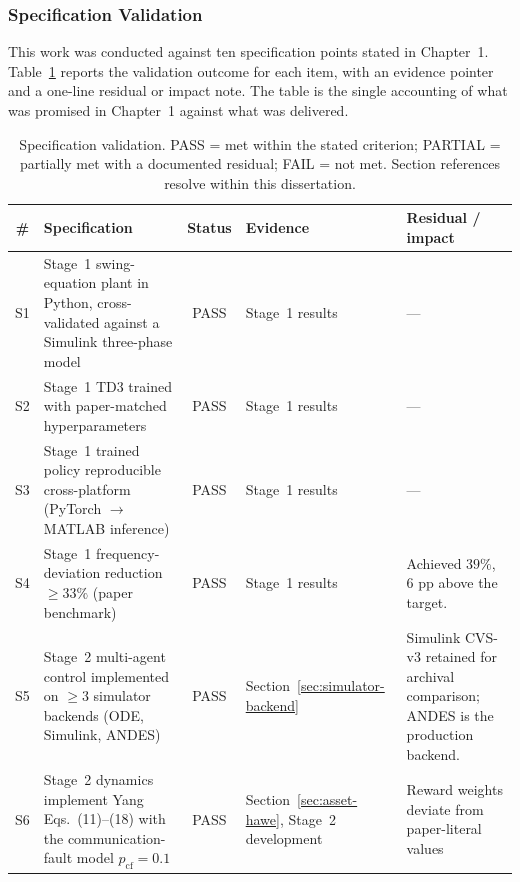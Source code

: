 \documentclass{unnc-fyp}
\begin{document}
\subsubsection{Specification Validation}
\label{sec:spec-validation}

This work was conducted against ten specification points stated
in Chapter~1.
Table~\ref{tab:spec-validation} reports the validation outcome
for each item, with an evidence pointer and a one-line residual
or impact note.
The table is the single accounting of what was promised in
Chapter~1 against what was delivered.

\begin{table}[tb]
  \centering
  \small
  \caption{Specification validation. PASS = met within the stated
           criterion; PARTIAL = partially met with a documented
           residual; FAIL = not met. Section references resolve
           within this dissertation.}
  \label{tab:spec-validation}
  \begin{tabular}{@{}cp{4.0cm}cp{2.7cm}p{3.4cm}@{}}
    \toprule
    \# & Specification & Status & Evidence & Residual / impact \\
    \midrule
    S1 & Stage~1 swing-equation plant in Python, cross-validated
         against a Simulink three-phase model
       & PASS
       & Stage~1 results
       & --- \\
    S2 & Stage~1 TD3 trained with paper-matched hyperparameters
       & PASS
       & Stage~1 results
       & --- \\
    S3 & Stage~1 trained policy reproducible cross-platform
         (PyTorch $\rightarrow$ MATLAB inference)
       & PASS
       & Stage~1 results
       & --- \\
    S4 & Stage~1 frequency-deviation reduction $\geq 33\%$
         (paper~\cite{benhmidouch2024td3} benchmark)
       & PASS
       & Stage~1 results
       & Achieved $39\%$, $6$ pp above the target. \\
    S5 & Stage~2 multi-agent control implemented on $\geq 3$
         simulator backends (ODE, Simulink, ANDES)
       & PASS
       & Section~\ref{sec:simulator-backend}
       & Simulink CVS-v3 retained for archival comparison;
         ANDES is the production backend. \\
    S6 & Stage~2 dynamics implement Yang Eqs.~(11)--(18) with the
         communication-fault model $p_{\mathrm{cf}} = 0.1$
       & PASS
       & Section~\ref{sec:asset-hawe}, Stage~2 development
       & Reward weights deviate from paper-literal values

\end{tabular}
\end{table}
\end{document}
